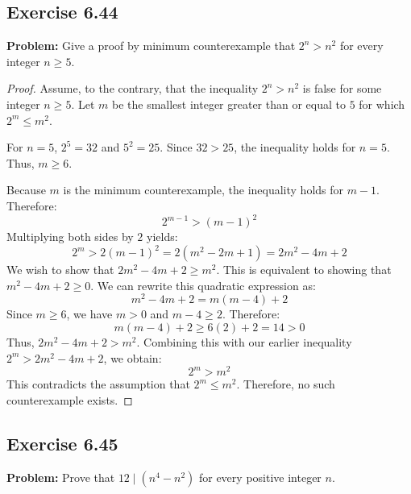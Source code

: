 \documentclass[11pt, a4paper]{article}
\theoremstyle{definition}
\theoremstyle{remark}
\begin{document}
\subsection{Exercise 6.44}
\textbf{Problem:} Give a proof by minimum counterexample that $2^n > n^2$ for every integer $n \ge 5$.

\begin{proof}
Assume, to the contrary, that the inequality $2^n > n^2$ is false for some integer $n \ge 5$. Let $m$ be the smallest integer greater than or equal to $5$ for which $2^m \le m^2$.

For $n=5$, $2^5 = 32$ and $5^2 = 25$. Since $32 > 25$, the inequality holds for $n=5$. Thus, $m \ge 6$.

Because $m$ is the minimum counterexample, the inequality holds for $m-1$. Therefore:
\[
2^{m-1} > (m-1)^2
\]
Multiplying both sides by $2$ yields:
\[
2^m > 2(m-1)^2 = 2(m^2 - 2m + 1) = 2m^2 - 4m + 2
\]
We wish to show that $2m^2 - 4m + 2 \ge m^2$. This is equivalent to showing that $m^2 - 4m + 2 \ge 0$.
We can rewrite this quadratic expression as:
\[
m^2 - 4m + 2 = m(m - 4) + 2
\]
Since $m \ge 6$, we have $m > 0$ and $m - 4 \ge 2$. Therefore:
\[
m(m - 4) + 2 \ge 6(2) + 2 = 14 > 0
\]
Thus, $2m^2 - 4m + 2 > m^2$. Combining this with our earlier inequality $2^m > 2m^2 - 4m + 2$, we obtain:
\[
2^m > m^2
\]
This contradicts the assumption that $2^m \le m^2$. Therefore, no such counterexample exists.
\end{proof}

\subsection{Exercise 6.45}
\textbf{Problem:} Prove that $12 \mid (n^4 - n^2)$ for every positive integer $n$.
\end{document}
